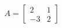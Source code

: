\documentclass[preview]{standalone}
\begin{document}
\begin{align*}
A = \begin{bmatrix} 2 & 1 \\ -3 & 2 \end{bmatrix}
\end{align*}
\end{document}
